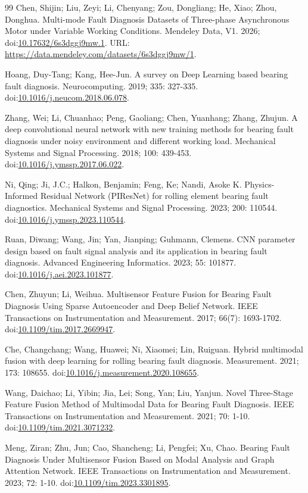 \documentclass[machines,article,submit,oneauthor]{Definitions/mdpi}
\begin{document}
\begin{thebibliography}{99}
 Chen, Shijin; Liu, Zeyi; Li, Chenyang; Zou, Dongliang; He, Xiao; Zhou, Donghua. Multi-mode Fault Diagnosis Datasets of Three-phase Asynchronous Motor under Variable Working Conditions. Mendeley Data, V1. 2026; doi:\url{10.17632/6s3dggj9mw.1}. URL: \url{https://data.mendeley.com/datasets/6s3dggj9mw/1}.

 Hoang, Duy-Tang; Kang, Hee-Jun. A survey on Deep Learning based bearing fault diagnosis. Neurocomputing. 2019; 335: 327-335. doi:\url{10.1016/j.neucom.2018.06.078}.

 Zhang, Wei; Li, Chuanhao; Peng, Gaoliang; Chen, Yuanhang; Zhang, Zhujun. A deep convolutional neural network with new training methods for bearing fault diagnosis under noisy environment and different working load. Mechanical Systems and Signal Processing. 2018; 100: 439-453. doi:\url{10.1016/j.ymssp.2017.06.022}.

 Ni, Qing; Ji, J.C.; Halkon, Benjamin; Feng, Ke; Nandi, Asoke K. Physics-Informed Residual Network (PIResNet) for rolling element bearing fault diagnostics. Mechanical Systems and Signal Processing. 2023; 200: 110544. doi:\url{10.1016/j.ymssp.2023.110544}.

 Ruan, Diwang; Wang, Jin; Yan, Jianping; Guhmann, Clemens. CNN parameter design based on fault signal analysis and its application in bearing fault diagnosis. Advanced Engineering Informatics. 2023; 55: 101877. doi:\url{10.1016/j.aei.2023.101877}.

 Chen, Zhuyun; Li, Weihua. Multisensor Feature Fusion for Bearing Fault Diagnosis Using Sparse Autoencoder and Deep Belief Network. IEEE Transactions on Instrumentation and Measurement. 2017; 66(7): 1693-1702. doi:\url{10.1109/tim.2017.2669947}.

 Che, Changchang; Wang, Huawei; Ni, Xiaomei; Lin, Ruiguan. Hybrid multimodal fusion with deep learning for rolling bearing fault diagnosis. Measurement. 2021; 173: 108655. doi:\url{10.1016/j.measurement.2020.108655}.

 Wang, Daichao; Li, Yibin; Jia, Lei; Song, Yan; Liu, Yanjun. Novel Three-Stage Feature Fusion Method of Multimodal Data for Bearing Fault Diagnosis. IEEE Transactions on Instrumentation and Measurement. 2021; 70: 1-10. doi:\url{10.1109/tim.2021.3071232}.

 Meng, Ziran; Zhu, Jun; Cao, Shancheng; Li, Pengfei; Xu, Chao. Bearing Fault Diagnosis Under Multisensor Fusion Based on Modal Analysis and Graph Attention Network. IEEE Transactions on Instrumentation and Measurement. 2023; 72: 1-10. doi:\url{10.1109/tim.2023.3301895}.


\end{thebibliography}
\end{document}
